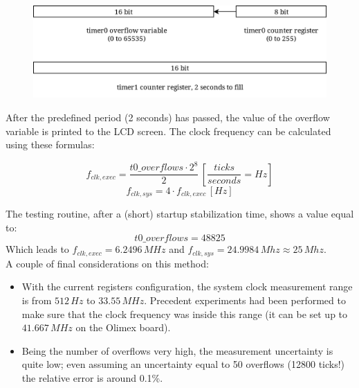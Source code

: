 \begin{figure}[h]
	\centering
	\includegraphics[width=0.7\linewidth]{images/timers}
	\label{fig:timers}
\end{figure}

\flushleft
After the predefined period (2 seconds) has passed, the value of the overflow variable is printed to the LCD screen. The clock frequency can be calculated using these formulas:

$$ f_{clk,exec} = \frac{t0\_overflows \cdot 2^8}{2}\, \left[{\frac{ticks}{seconds} = Hz}\right]$$
$$ f_{clk,sys} = 4 \cdot f_{clk,exec}\,\left[Hz\right] $$

\flushleft
The testing routine, after a (short) startup stabilization time, shows a value equal to:
$$ t0\_overflows = 48825 $$
Which leads to $f_{clk,exec} = 6.2496\,MHz$ and $f_{clk,sys} = 24.9984\,Mhz \approx 25\,Mhz$.\\
\flushleft
A couple of final considerations on this method:
\begin{itemize}
	\item With the current registers configuration, the system clock measurement range is from $512\,Hz$ to $33.55\,MHz$. Precedent experiments had been performed to make sure that the clock frequency was inside this range (it can be set up to $41.667\,MHz$ on the Olimex board).
	\item Being the number of overflows very high, the measurement uncertainty is quite low; even assuming an uncertainty equal to 50 overflows (12800 ticks!) the relative error is around 0.1\%.
\end{itemize}